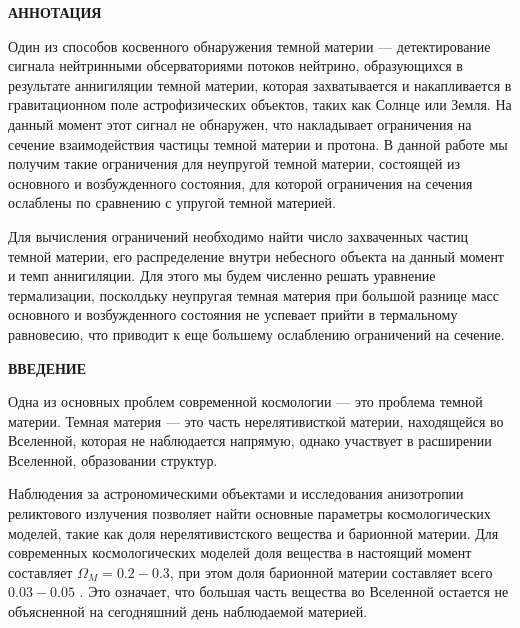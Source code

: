 \newpage
\begin{center}
  \textbf{\large АННОТАЦИЯ}
\end{center}

Один из способов косвенного обнаружения темной материи --- детектирование сигнала нейтринными обсерваториями потоков нейтрино, образующихся в результате аннигиляции темной материи, которая захватывается и накапливается  в гравитационном поле астрофизических объектов, таких как Солнце или Земля. На данный момент этот сигнал не обнаружен, что накладывает ограничения на сечение взаимодействия частицы темной материи и протона. В данной работе мы получим такие ограничения для неупругой темной материи, состоящей из основного и возбужденного состояния, для которой ограничения на сечения ослаблены по сравнению с упругой темной материей. 

Для вычисления ограничений необходимо найти число захваченных частиц темной материи, его распределение внутри небесного объекта на данный момент и темп аннигиляции. Для этого мы будем численно решать уравнение термализации, посколдьку неупругая темная материя при большой разнице масс основного и возбужденного состояния не успевает прийти в термальному равновесию, что приводит к еще большему ослаблению ограничений на сечение.

\onehalfspacing
\setcounter{page}{2}

\newpage
\renewcommand{\contentsname}{\centerline{\large СОДЕРЖАНИЕ}}
\tableofcontents

\newpage
\begin{center}
  \textbf{\large ВВЕДЕНИЕ}
\end{center}


Одна из основных проблем современной космологии --- это проблема темной материи.  Темная материя --- это часть нерелятивисткой материи, находящейся во Вселенной, которая не наблюдается напрямую, однако участвует в расширении Вселенной, образовании структур. 


Наблюдения за астрономическими объектами и исследования анизотропии реликтового излучения позволяет найти основные параметры космологических моделей, такие как доля нерелятивистского вещества и барионной материи. Для современных космологических моделей доля вещества в настоящий момент составляет $\Omega_M = 0.2-0.3$, при этом доля барионной материи составляет всего $0.03-0.05$ \cite{Cao_2023}. Это означает, что большая часть вещества во Вселенной остается не объясненной на сегодняшний день наблюдаемой материей.

